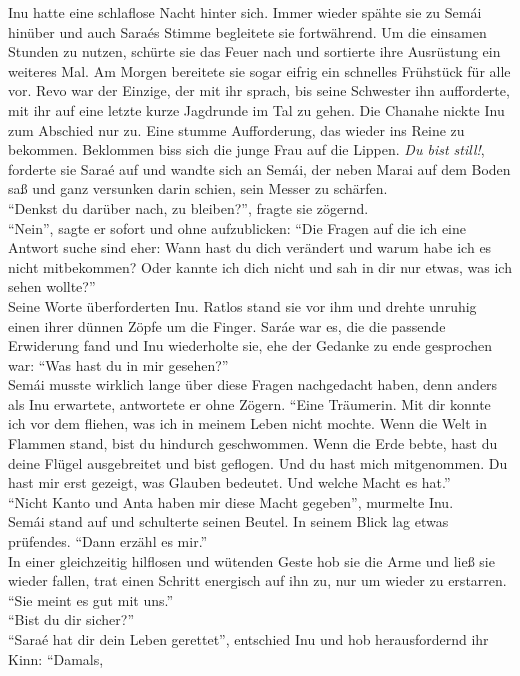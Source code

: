 Inu hatte eine schlaflose Nacht hinter sich. Immer wieder spähte sie zu Semái hinüber und auch 
Saraés Stimme begleitete sie fortwährend. Um die einsamen Stunden zu nutzen, schürte sie das Feuer 
nach und sortierte ihre Ausrüstung ein weiteres Mal. Am Morgen bereitete sie sogar eifrig ein 
schnelles Frühstück für alle vor. Revo war der Einzige, der mit ihr sprach, bis seine Schwester ihn 
aufforderte, mit ihr auf eine letzte kurze Jagdrunde im Tal zu gehen. Die Chanahe nickte Inu zum 
Abschied nur zu. Eine stumme Aufforderung, das wieder ins Reine zu bekommen. Beklommen biss sich die 
junge Frau auf die Lippen. \textit{Du bist still!}, forderte sie Saraé auf und wandte sich an Semái, 
der neben Marai auf dem Boden saß und ganz versunken darin schien, sein Messer zu schärfen.\\
``Denkst du darüber nach, zu bleiben?'', fragte sie zögernd.\\
``Nein'', sagte er sofort und ohne aufzublicken: ``Die Fragen auf die ich eine Antwort suche sind 
eher: Wann hast du dich verändert und warum habe ich es nicht mitbekommen? Oder kannte ich dich 
nicht und sah in dir nur etwas, was ich sehen wollte?''\\
Seine Worte überforderten Inu. Ratlos stand sie vor ihm und drehte unruhig einen ihrer dünnen Zöpfe 
um die Finger. Saráe war es, die die passende Erwiderung fand und Inu wiederholte sie, ehe der 
Gedanke zu ende gesprochen war: ``Was hast du in mir gesehen?''\\
Semái musste wirklich lange über diese Fragen nachgedacht haben, denn anders als Inu erwartete, 
antwortete er ohne Zögern. ``Eine Träumerin. Mit dir konnte ich vor dem fliehen, was ich in meinem 
Leben nicht mochte. Wenn die Welt in Flammen stand, bist du hindurch geschwommen. Wenn die Erde 
bebte, hast du deine Flügel ausgebreitet und bist geflogen. Und du hast mich mitgenommen. Du hast 
mir erst gezeigt, was Glauben bedeutet. Und welche Macht es hat.''\\
``Nicht Kanto und Anta haben mir diese Macht gegeben'', murmelte Inu.\\
Semái stand auf und schulterte seinen Beutel. In seinem Blick lag etwas prüfendes. ``Dann erzähl 
es mir.''\\
In einer gleichzeitig hilflosen und wütenden Geste hob sie die Arme und ließ sie wieder fallen, 
trat einen Schritt energisch auf ihn zu, nur um wieder zu erstarren. ``Sie meint es gut mit uns.''\\
``Bist du dir sicher?''\\
``Saraé hat dir dein Leben gerettet'', entschied Inu und hob herausfordernd ihr Kinn: ``Damals, 
